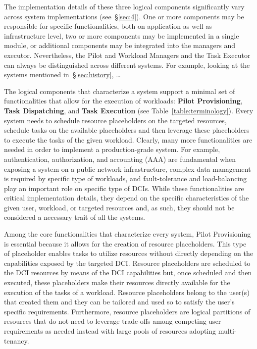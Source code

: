 \documentclass{sig-alternate}
\begin{document}
The implementation details of these three logical components
significantly vary across \pilot system implementations
(see~\S\ref{sec:4}). One or more components may be responsible for
specific functionalities, both on application as well as infrastructure
level, two or more components may be implemented in a single module, or
additional components may be integrated into the managers and executor.
Nevertheless, the Pilot and Workload Managers and the Task Executor can
always be distinguished across different \pilot systems. For example,
looking at the systems mentioned in~\S\ref{sec:history}, \ldots
{}

The logical components that characterize a \pilot system support a
minimal set of functionalities that allow for the execution of
workloads: \textbf{Pilot Provisioning}, \textbf{Task Dispatching}, and
\textbf{Task Execution} (see Table~\ref{table:terminology}). Every
\pilot system needs to schedule resource placeholders on the targeted
resources, schedule tasks on the available placeholders and then
leverage these placeholders to execute the tasks of the given workload.
Clearly, many more functionalities are needed in order to implement a
production-grade \pilot system. For example, authentication,
authorization, and accounting (AAA) are fundamental when exposing a
\pilot system on a public network infrastructure, complex data
management is required by specific type of workloads, and
fault-tolerance and load-balancing play an important role on specific
type of DCIs. While these functionalities are critical implementation
details, they depend on the specific characteristics of the given user,
workload, or targeted resources and, as such, they should not be
considered a necessary trait of all the \pilot systems.

Among the core functionalities that characterize every \pilot system,
Pilot Provisioning is essential because it allows for the creation of
resource placeholders. This type of placeholder enables tasks to utilize
resources without directly depending on the capabilities exposed by the
targeted DCI. Resource placeholders are scheduled to the DCI resources
by means of the DCI capabilities but, once scheduled and then executed,
these placeholders make their resources directly available for the
execution of the tasks of a workload. Resource placeholders belong to
the user(s) that created them and they can be tailored and used so to
satisfy the user's specific requirements. Furthermore, resource
placeholders are logical partitions of resources that do not need to
leverage trade-offs among competing user requirements as needed instead
with large pools of resources adopting multi-tenancy.
\end{document}

